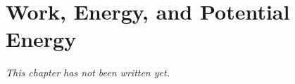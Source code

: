 \chapter{Work, Energy, and Potential Energy}\label{ch:b1:work-and-energy}


\emph{This chapter has not been written yet.}
